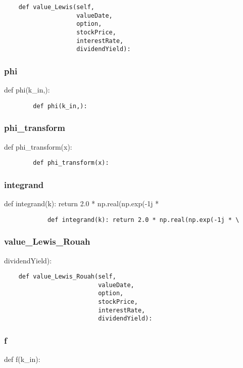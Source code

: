 \documentclass[twoside,11pt]{book}
\begin{document}
\begin{lstlisting}
    def value_Lewis(self,
                    valueDate,
                    option,
                    stockPrice,
                    interestRate,
                    dividendYield):
\end{lstlisting}

\subsubsection*{{\bf phi}}
def phi(k\_in,): 

\begin{lstlisting}
        def phi(k_in,):
\end{lstlisting}

\subsubsection*{{\bf phi\_transform}}
def phi\_transform(x): 

\begin{lstlisting}
        def phi_transform(x):
\end{lstlisting}

\subsubsection*{{\bf integrand}}
def integrand(k): return 2.0 * np.real(np.exp(-1j * \ 

\begin{lstlisting}
            def integrand(k): return 2.0 * np.real(np.exp(-1j * \
\end{lstlisting}

\subsubsection*{{\bf value\_Lewis\_Rouah}}
dividendYield): 

\begin{lstlisting}
    def value_Lewis_Rouah(self,
                          valueDate,
                          option,
                          stockPrice,
                          interestRate,
                          dividendYield):
\end{lstlisting}

\subsubsection*{{\bf f}}
def f(k\_in): 
\end{document}
